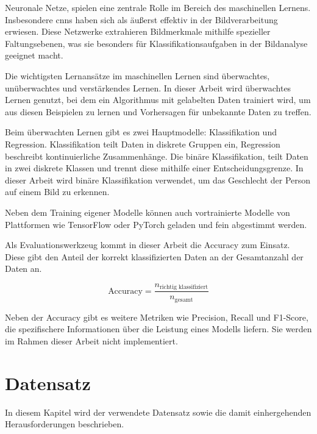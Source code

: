 \documentclass[journal,twoside,web]{ieeecolor}
\begin{document}
Neuronale Netze, spielen eine zentrale Rolle im Bereich des maschinellen Lernens. Insbesondere \acp{cnn} haben sich als äußerst effektiv in der Bildverarbeitung erwiesen. Diese Netzwerke extrahieren Bildmerkmale mithilfe spezieller Faltungsebenen, was sie besonders für Klassifikationsaufgaben in der Bildanalyse geeignet macht.

Die wichtigsten Lernansätze im maschinellen Lernen sind überwachtes, unüberwachtes und verstärkendes Lernen. In dieser Arbeit wird überwachtes Lernen genutzt, bei dem ein Algorithmus mit gelabelten Daten trainiert wird, um aus diesen Beispielen zu lernen und Vorhersagen  für unbekannte Daten zu treffen.

Beim überwachten Lernen gibt es zwei Hauptmodelle: Klassifikation und Regression. Klassifikation teilt Daten in diskrete Gruppen ein, Regression beschreibt kontinuierliche Zusammenhänge. Die binäre Klassifikation, teilt Daten in zwei diskrete Klassen und trennt diese mithilfe einer Entscheidungsgrenze. In dieser Arbeit wird binäre Klassifikation verwendet, um das Geschlecht der Person auf einem Bild zu erkennen.

Neben dem Training eigener Modelle können auch vortrainierte Modelle von Plattformen wie TensorFlow oder PyTorch geladen und fein abgestimmt werden.

Als Evaluationswerkzeug kommt in dieser Arbeit die Accuracy zum Einsatz. Diese gibt den Anteil der korrekt klassifizierten Daten an der Gesamtanzahl der Daten an. 

\begin{equation}
    \text{Accuracy} = \frac{n_{\text{richtig klassifiziert}}}{n_{\text{gesamt}}}
\end{equation}

Neben der Accuracy gibt es weitere Metriken wie Precision, Recall und F1-Score, die spezifischere Informationen über die Leistung eines Modells liefern. Sie werden im Rahmen dieser Arbeit nicht implementiert.





\section{Datensatz} 
\label{sec:dataset}
In diesem Kapitel wird der verwendete Datensatz sowie die damit einhergehenden Herausforderungen beschrieben.
\end{document}
